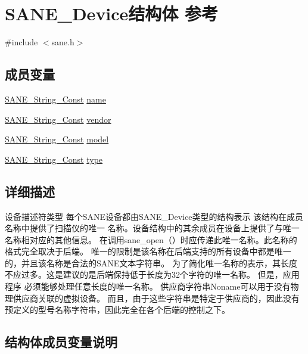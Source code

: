 \hypertarget{structSANE__Device}{}\section{S\+A\+N\+E\+\_\+\+Device结构体 参考}
\label{structSANE__Device}


{\ttfamily \#include $<$sane.\+h$>$}

\subsection*{成员变量}
\begin{DoxyCompactItemize}
\item 
\hyperlink{sane_8h_a9a47323dab2a36db080f1bcc11585af4}{S\+A\+N\+E\+\_\+\+String\+\_\+\+Const} \hyperlink{structSANE__Device_a6ade6e5e2cf659520c0ceae0c50adc55}{name}
\item 
\hyperlink{sane_8h_a9a47323dab2a36db080f1bcc11585af4}{S\+A\+N\+E\+\_\+\+String\+\_\+\+Const} \hyperlink{structSANE__Device_a30329d1b829b0d7308c31e18f8a81ccf}{vendor}
\item 
\hyperlink{sane_8h_a9a47323dab2a36db080f1bcc11585af4}{S\+A\+N\+E\+\_\+\+String\+\_\+\+Const} \hyperlink{structSANE__Device_a053a3964744fbd7a304c00332678e200}{model}
\item 
\hyperlink{sane_8h_a9a47323dab2a36db080f1bcc11585af4}{S\+A\+N\+E\+\_\+\+String\+\_\+\+Const} \hyperlink{structSANE__Device_ac66eea9d60c35fea4af804e6fecbe473}{type}
\end{DoxyCompactItemize}


\subsection{详细描述}
设备描述符类型 每个\+S\+A\+N\+E设备都由\+S\+A\+N\+E\+\_\+\+Device类型的结构表示 该结构在成员名称中提供了扫描仪的唯一 名称。设备结构中的其余成员在设备上提供了与唯一名称相对应的其他信息。 在调用sane\+\_\+open（）时应传递此唯一名称。此名称的格式完全取决于后端。 唯一的限制是该名称在后端支持的所有设备中都是唯一的，并且该名称是合法的\+S\+A\+N\+E文本字符串。 为了简化唯一名称的表示，其长度不应过多。这是建议的是后端保持低于长度为32个字符的唯一名称。 但是，应用程序 必须能够处理任意长度的唯一名称。 供应商字符串\+Noname可以用于没有物理供应商关联的虚拟设备。 而且，由于这些字符串是特定于供应商的，因此没有预定义的型号名称字符串，因此完全在各个后端的控制之下。 

\subsection{结构体成员变量说明}
\mbox{\label{structSANE__Device_a053a3964744fbd7a304c00332678e200}} 
